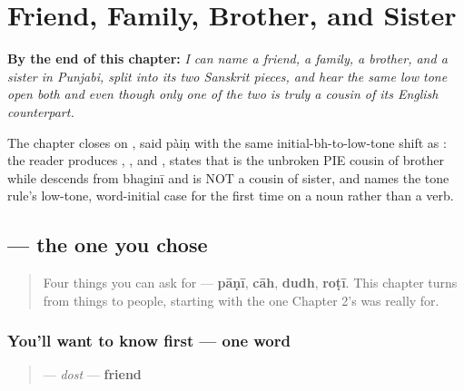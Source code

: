 
\chapter{Friend, Family, Brother, and Sister}
\label{ch:pa-friend-and-family}

\begin{chapteropening}
\textbf{By the end of this chapter:} \emph{I can name a friend, a family, a brother, and a sister in Punjabi, split  into its two Sanskrit pieces, and hear the same low tone open both  and  even though only one of the two is truly a cousin of its English counterpart.}

The chapter closes on , said pàiṇ with the same initial-bh-to-low-tone shift as : the reader produces , ,  and , states that  is the unbroken PIE cousin of brother while  descends from bhaginī and is NOT a cousin of sister, and names the tone rule's low-tone, word-initial case for the first time on a noun rather than a verb.
\end{chapteropening}

\section[\texorpdfstring{\pa{ਦੋਸਤ} (dost)}{ਦੋਸਤ (dost)}]{ — the one you chose}

\label{lesson:PA-C11-dost}



\begin{quote}
Four things you can ask for — \textbf{pāṇī}, \textbf{cāh}, \textbf{dudh}, \textbf{roṭī}. This chapter turns from things to people, starting with the one Chapter 2's \textbf{} was really for.
\end{quote}

\subsection*{You'll want to know first — one word}
\begin{quote}
\textbf{} — \emph{dost} — \textbf{friend}
\end{quote}


